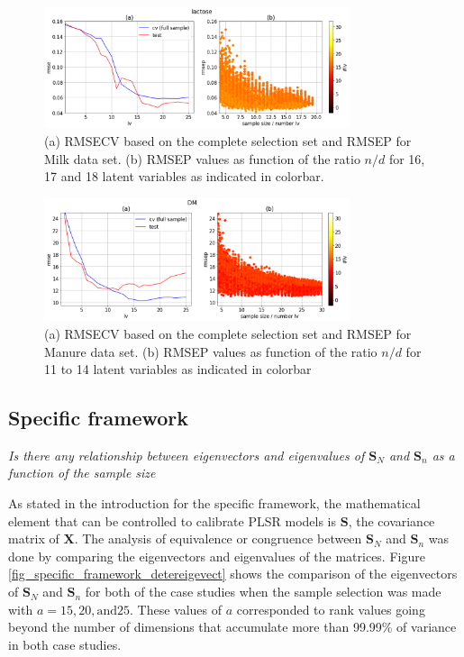 \documentclass[journal=ancham,manuscript=article]{achemso}
\begin{document}
\begin{figure}[b]
\includegraphics[width=0.8\textwidth]{manuscript/figures/d01_milk_general_framework.png}
\centering
\caption{(a) RMSECV based on the complete selection set and RMSEP for Milk data set. (b) RMSEP values as function of the ratio $n/d$ for 16, 17 and 18 latent variables as indicated in colorbar.}
\label{fig_d01_milk_general_framework}
\end{figure}

\begin{figure}[b]
\includegraphics[width=0.8\textwidth]{manuscript/figures/d02_manure_general_framework.png}
\centering
\caption{(a) RMSECV based on the complete selection set and RMSEP for Manure data set. (b) RMSEP values as function of the ratio $n/d$ for 11 to 14 latent variables as indicated in colorbar}
\label{fig_d02_manure_general_framework}
\end{figure}

\subsection*{Specific framework}\label{results:specframework}

\emph{Is there any relationship between eigenvectors and eigenvalues of $\mathbf{S}_N$ and $\mathbf{S}_n$ as a function of the sample size}

As stated in the introduction for the specific framework, the mathematical element that can be controlled to calibrate PLSR models is $\mathbf{S}$, the covariance matrix of $\mathbf{X}$. The analysis of equivalence or congruence between $\mathbf{S}_N$ and $\mathbf{S}_n$ was done by comparing the eigenvectors and eigenvalues of the matrices. Figure \ref{fig_specific_framework_detereigevect} shows the comparison of the eigenvectors of $\mathbf{S}_N$ and $\mathbf{S}_n$ for both of the case studies when the sample selection was made with $a=15,20,\text{and} 25$. These values of $a$ corresponded to rank values going beyond the number of dimensions that accumulate more than 99.99\% of variance in both case studies.
\end{document}
